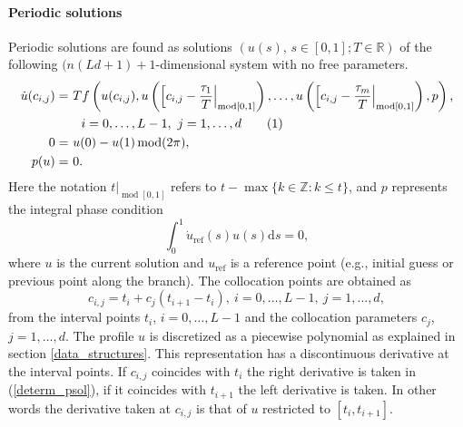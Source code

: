 \documentclass[10pt]{scrartcl}
\renewcommand{\d}{\mathrm{d}}
\newcommand{\RR}{\mathbb{R}}
\newcommand{\ZZ}{\mathbb{Z}}
\renewcommand{\mod}{\operatorname{mod}}
\newcommand\numberthis{\addtocounter{equation}{1}\tag{\theequation}}
\begin{document}
{\paragraph{Periodic solutions}
Periodic solutions are found as solutions $(u(s),\,s\in[0,1];T\in\RR)$
of the following $(n(Ld+1)+1$-dimensional system with no free
parameters.
\begin{align*}\label{determ_psol}
\dot{u}(c_{i,j})=&\
Tf\left(u(c_{i,j}),u\left(\left[c_{i,j}-\frac{\tau_1}{T}\right\vert_{\mod[0,1]}\right),\ldots,
u\left(\left[c_{i,j}-\frac{\tau_m}{T}\right\vert_{\mod[0,1]}\right),{p}\right)\mbox{,}\\
&\quad i=0,\ldots,L-1,\ j=1,\ldots,d \numberthis\\
0=&\ u(0)-u(1)\mod(2\pi), \\
p(u)=&\ 0.
\end{align*}
Here the notation $t\vert_{\mod[0,1]}$ refers to
$t-\max\{k\in\ZZ:k\leq t\}$, and $p$ represents the integral phase
condition
\begin{equation}\label{integral_phase_cond}
\int_0^1\dot{u}_\mathrm{ref}(s) u(s)\d s=0,
\end{equation}
where $u$ is the current solution and $u_\mathrm{ref}$ is a reference point (e.g., initial guess or previous point along the branch).
The collocation points are obtained as 
\[
c_{i,j}=t_i+c_j(t_{i+1}-t_i),\ i=0,\ldots,L-1,\ j=1,\ldots,d,
\]
from the interval points $t_i$, $i=0,\ldots,L-1$ and the collocation
parameters $c_j$, $j=1,\ldots,d$.  The profile $u$ is discretized as a
piecewise polynomial as explained in section \ref{data_structures}.
This representation has a discontinuous derivative at the interval
points. If $c_{i,j}$ coincides with $t_i$ the right derivative is
taken in (\ref{determ_psol}), if it coincides with $t_{i+1}$ the left
derivative is taken. In other words the derivative taken at $c_{i,j}$
is that of $u$ restricted to $[t_i,t_{i+1}]$.

}
\end{document}
